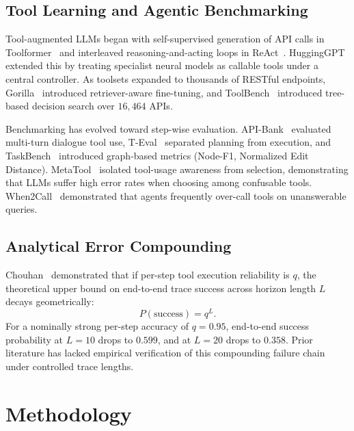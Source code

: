 \documentclass[10pt,journal,compsoc]{IEEEtran}
\begin{document}
\subsection{Tool Learning and Agentic Benchmarking}
Tool-augmented LLMs began with self-supervised generation of API calls in Toolformer~\cite{schick2023toolformer} and interleaved reasoning-and-acting loops in ReAct~\cite{yao2023react}. HuggingGPT~\cite{shen2023hugginggpt} extended this by treating specialist neural models as callable tools under a central controller. As toolsets expanded to thousands of RESTful endpoints, Gorilla~\cite{patil2023gorilla} introduced retriever-aware fine-tuning, and ToolBench~\cite{qin2024toolllm} introduced tree-based decision search over $16,464$ APIs.

Benchmarking has evolved toward step-wise evaluation. API-Bank~\cite{li2023apibank} evaluated multi-turn dialogue tool use, T-Eval~\cite{chen2024teval} separated planning from execution, and TaskBench~\cite{shen2023taskbench} introduced graph-based metrics (Node-F1, Normalized Edit Distance). MetaTool~\cite{huang2024metatool} isolated tool-usage awareness from selection, demonstrating that LLMs suffer high error rates when choosing among confusable tools. When2Call~\cite{ross2025when2call} demonstrated that agents frequently over-call tools on unanswerable queries.

\subsection{Analytical Error Compounding}
Chouhan~\cite{chouhan2026evaluating} demonstrated that if per-step tool execution reliability is $q$, the theoretical upper bound on end-to-end trace success across horizon length $L$ decays geometrically:
\begin{equation}
P(\text{success}) = q^L.
\label{eq:compounding}
\end{equation}
For a nominally strong per-step accuracy of $q = 0.95$, end-to-end success probability at $L = 10$ drops to $0.599$, and at $L = 20$ drops to $0.358$. Prior literature has lacked empirical verification of this compounding failure chain under controlled trace lengths.

\section{Methodology}
\end{document}
